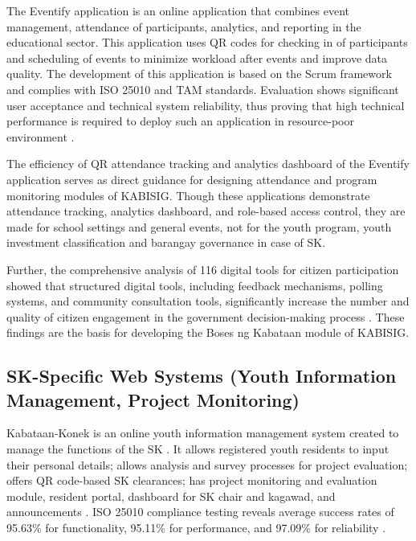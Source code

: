 \hspace*{\parindent}The Eventify application is an online application that combines event management, attendance of participants, analytics, and reporting in the educational sector. This application uses QR codes for checking in of participants and scheduling of events to minimize workload after events and improve data quality. The development of this application is based on the Scrum framework and complies with ISO 25010 and TAM standards. Evaluation shows significant user acceptance and technical system reliability, thus proving that high technical performance is required to deploy such an application in resource-poor environment \cite{A}.
\vspace{5mm}

\hspace*{\parindent}The efficiency of QR attendance tracking and analytics dashboard of the Eventify application \cite{A} serves as direct guidance for designing attendance and program monitoring modules of KABISIG. Though these applications demonstrate attendance tracking, analytics dashboard, and role-based access control, they are made for school settings and general events, not for the youth program, youth investment classification and barangay governance in case of SK.
\vspace{5mm}

\hspace*{\parindent}Further, the comprehensive analysis of 116 digital tools for citizen participation showed that structured digital tools, including feedback mechanisms, polling systems, and community consultation tools, significantly increase the number and quality of citizen engagement in the government decision-making process \cite{AX}. These findings are the basis for developing the Boses ng Kabataan module of KABISIG.
\vspace{5mm}

\subsection{SK-Specific Web Systems (Youth Information Management, Project Monitoring)}

\hspace*{\parindent}Kabataan-Konek is an online youth information management system created to manage the functions of the SK \cite{E}. It allows registered youth residents to input their personal details; allows analysis and survey processes for project evaluation; offers QR code-based SK clearances; has project monitoring and evaluation module, resident portal, dashboard for SK chair and kagawad, and announcements \cite{E}. ISO 25010 compliance testing reveals average success rates of 95.63\% for functionality, 95.11\% for performance, and 97.09\% for reliability \cite{E}.
\vspace{5mm}

